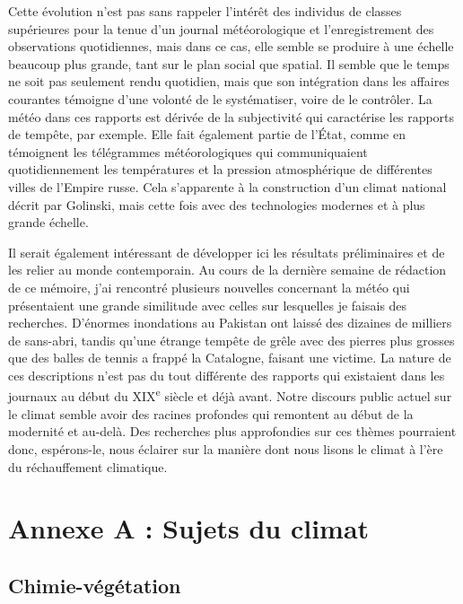 \documentclass[a4paper,twoside,12pt]{article}
\begin{document}
Cette évolution n'est pas sans rappeler l'intérêt des individus de classes supérieures pour la tenue d'un journal météorologique et l'enregistrement des observations quotidiennes, mais dans ce cas, elle semble se produire à une échelle beaucoup plus grande, tant sur le plan social que spatial. Il semble que le temps ne soit pas seulement rendu quotidien, mais que son intégration dans les affaires courantes témoigne d'une volonté de le systématiser, voire de le contrôler. La météo dans ces rapports est dérivée de la subjectivité qui caractérise les rapports de tempête, par exemple. Elle fait également partie de l'État, comme en témoignent les télégrammes météorologiques qui communiquaient quotidiennement les températures et la pression atmosphérique de différentes villes de l'Empire russe. Cela s'apparente à la construction d'un \og climat national \fg{} décrit par Golinski, mais cette fois avec des technologies modernes et à plus grande échelle.

Il serait également intéressant de développer ici les résultats préliminaires et de les relier au monde contemporain. Au cours de la dernière semaine de rédaction de ce mémoire, j'ai rencontré plusieurs nouvelles concernant la météo qui présentaient une grande similitude avec celles sur lesquelles je faisais des recherches. D'énormes inondations au Pakistan ont laissé des dizaines de milliers de sans-abri, tandis qu'une étrange tempête de grêle avec des pierres plus grosses que des balles de tennis a frappé la Catalogne, faisant une victime. La nature de ces descriptions n'est pas du tout différente des rapports qui existaient dans les journaux au début du XIX\textsuperscript{e} siècle et déjà avant. Notre discours public actuel sur le climat semble avoir des racines profondes qui remontent au début de la modernité et au-delà. Des recherches plus approfondies sur ces thèmes pourraient donc, espérons-le, nous éclairer sur la manière dont nous lisons le climat à l'ère du réchauffement climatique.


\clearpage


\section*{Annexe A : Sujets du climat} \label{annexe}

\subsection*{Chimie-végétation} \label{topic1_chimie-vegetation}
\end{document}
